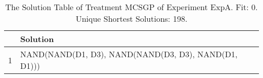 \begin{table}[ht]
\centering
\begin{tabular}{rp{9cm}}
  \hline
 & Solution \\ 
  \hline
1 & NAND(NAND(D1, D3), NAND(NAND(D3, D3), NAND(D1, D1))) \\ 
   \hline
\end{tabular}
\caption{The Solution Table of Treatment MCSGP of Experiment ExpA. Fit: 0. Unique Shortest Solutions: 198.} 
\end{table}

